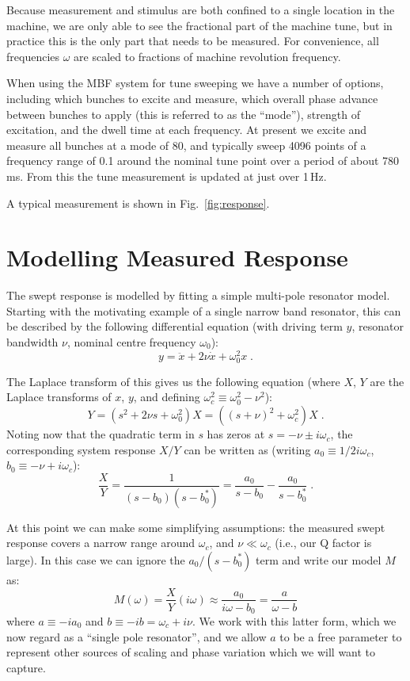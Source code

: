 \documentclass[
    a4paper,
    keeplastbox,            %
    hyphens,                %
    nospread,               %
    refpage,                %
]{jacow}
\begin{document}
Because measurement and stimulus are both confined to a single location in the
machine, we are only able to see the fractional part of the machine tune, but in
practice this is the only part that needs to be measured.  For convenience, all
frequencies $\omega$ are scaled to fractions of machine revolution frequency.

When using the MBF system for tune sweeping we have a number of options,
including which bunches to excite and measure, which overall phase advance
between bunches to apply (this is referred to as the ``mode''), strength of
excitation, and the dwell time at each frequency.  At present we excite and
measure all bunches at a mode of 80, and typically sweep 4096 points of a
frequency range of 0.1 around the nominal tune point over a period of about
780\,ms.  From this the tune measurement is updated at just over 1\,Hz.

A typical measurement is shown in Fig.~\ref{fig:response}.

\section{Modelling Measured Response}

The swept response is modelled by fitting a simple multi-pole resonator model.
Starting with the motivating example of a single narrow band resonator, this can
be described by the following differential equation (with driving term $y$,
resonator bandwidth $\nu$, nominal centre frequency $\omega_0$):
\[
    y = \ddot x + 2\nu\dot x + \omega_0^2 x \;.
\]

The Laplace transform of this gives us the following equation (where $X$, $Y$
are the Laplace transforms of $x$, $y$, and defining
$\omega_c^2\equiv\omega_0^2-\nu^2$):
\[
    Y = (s^2 + 2\nu s + \omega_0^2)X = ((s + \nu)^2 + \omega_c^2)X \;.
\]
Noting now that the quadratic term in $s$ has zeros at $s=-\nu\pm i\omega_c$,
the corresponding system response $X/Y$ can be written as (writing
$a_0\equiv1/2i\omega_c$, $b_0\equiv-\nu+i\omega_c$):
\[
    \frac XY =
    \frac{1}{(s-b_0)(s-b_0^*)} = \frac{a_0}{s-b_0} - \frac{a_0}{s-b_0^*} \;.
\]

At this point we can make some simplifying assumptions: the measured swept
response covers a narrow range around $\omega_c$, and ${\nu\ll\omega_c}$ (i.e.,
our Q factor is large).  In this case we can ignore the $a_0/(s-b_0^*)$ term and
write our model $M$ as:
\[
    M(\omega) = \frac XY(i\omega) \approx
    \frac{a_0}{i\omega-b_0} =
    \frac{a}{\omega-b}
\]
where $a\equiv-ia_0$ and $b\equiv-ib=\omega_c+i\nu$.  We work with this latter
form, which we now regard as a ``single pole resonator'', and we allow $a$ to be
a free parameter to represent other sources of scaling and phase variation which
we will want to capture.
\end{document}
